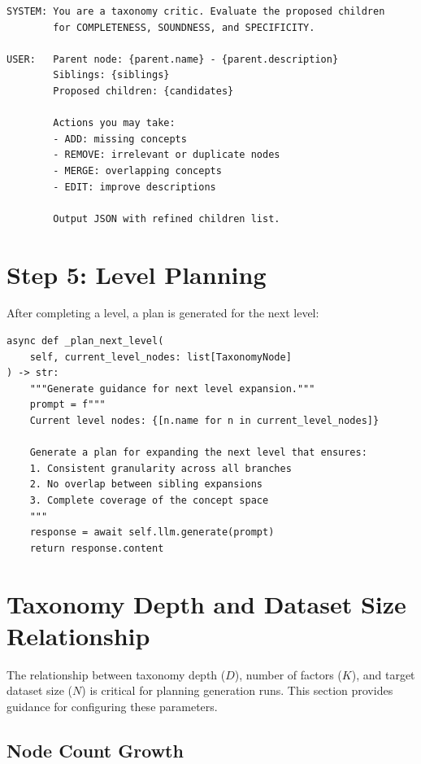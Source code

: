 \begin{lstlisting}[language=jsonx,caption={Critic refinement prompt}]
SYSTEM: You are a taxonomy critic. Evaluate the proposed children
        for COMPLETENESS, SOUNDNESS, and SPECIFICITY.
        
USER:   Parent node: {parent.name} - {parent.description}
        Siblings: {siblings}
        Proposed children: {candidates}
        
        Actions you may take:
        - ADD: missing concepts
        - REMOVE: irrelevant or duplicate nodes
        - MERGE: overlapping concepts
        - EDIT: improve descriptions
        
        Output JSON with refined children list.
\end{lstlisting}

\section{Step 5: Level Planning}

After completing a level, a plan is generated for the next level:

\begin{lstlisting}[language=jsonx,caption={Level planning}]
async def _plan_next_level(
    self, current_level_nodes: list[TaxonomyNode]
) -> str:
    """Generate guidance for next level expansion."""
    prompt = f"""
    Current level nodes: {[n.name for n in current_level_nodes]}
    
    Generate a plan for expanding the next level that ensures:
    1. Consistent granularity across all branches
    2. No overlap between sibling expansions
    3. Complete coverage of the concept space
    """
    response = await self.llm.generate(prompt)
    return response.content
\end{lstlisting}

\section{Taxonomy Depth and Dataset Size Relationship}
\label{sec:depth-size-relationship}

The relationship between taxonomy depth ($D$), number of factors ($K$), and target
dataset size ($N$) is critical for planning generation runs. This section provides
guidance for configuring these parameters.

\subsection{Node Count Growth}

